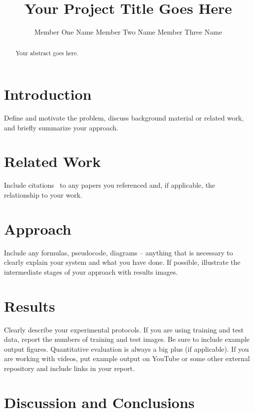 \documentclass[10pt,twocolumn,letterpaper]{article}
\begin{document}
\title{Your Project Title Goes Here}

\author{
  Member One Name \hspace{1in} Member Two Name \hspace{1in} Member Three Name
}
\maketitle

\begin{abstract}
  Your abstract goes here.
\end{abstract}

\section{Introduction}

Define and motivate the problem, discuss background material or related work, and briefly summarize your approach.

\section{Related Work}

Include citations~\cite{Alpher02,Alpher03} to any papers you referenced and, if applicable, the relationship to your work.

\section{Approach}

Include any formulas, pseudocode, diagrams -- anything that is necessary to clearly explain your system and what you have done. If possible, illustrate the intermediate stages of your approach with results images.

\section{Results}

Clearly describe your experimental protocols. If you are using training and test data, report the numbers of training and test images. Be sure to include example output figures. Quantitative evaluation is always a big plus (if applicable). If you are working with videos, put example output on YouTube or some other external repository and include links in your report.

\section{Discussion and Conclusions}
\end{document}
